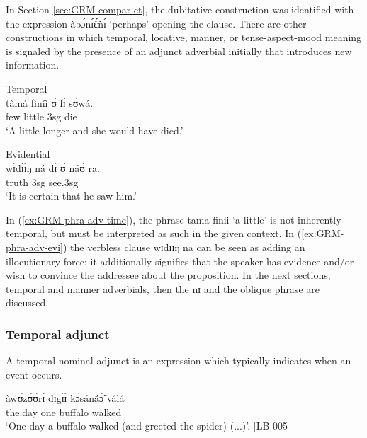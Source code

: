 \begin{exe}
\begin{exe}
\begin{exe}
 In Section \ref{sec:GRM-compar-ct}, the dubitative construction was 
identified with the expression {\sls àbɔ́nɪ̃́ɛ̃́nɪ́}  `perhaps'  opening the 
clause. There are other constructions in which temporal, locative, manner, or 
tense-aspect-mood meaning is signaled by the presence of an adjunct adverbial  
initially that introduces new information.  

\ea\label{ex:GRM-phra-adv}

\ea\label{ex:GRM-phra-adv-time}{\rm Temporal}\\
\gll {\ob}tàmá fìníì{\cb} ʊ̀ fɪ̀ sʊ́wá.\\
few little {\sc 3sg} {\mod} die\\
\glt `A little longer and she would  have died.'


\ex\label{ex:GRM-phra-adv-evi}{\rm Evidential}\\
\gll {\ob}wɪ́dɪ́ɪ́ŋ ná{\cb} dɪ́ ʊ̀ náʊ́ rā.\\
truth {\foc} {\comp} {\sc 3sg} see.{\sc 3sg} {\foc}\\
\glt  `It is certain that he saw him.'

\z 
 \z



In (\ref{ex:GRM-phra-adv-time}), the phrase {\sls tama finii} `a little'  is not inherently 
temporal, but must be interpreted as such in the given context. In 
(\ref{ex:GRM-phra-adv-evi}) the verbless clause {\sls wɪdɪɪŋ na}  can be seen as 
adding an illocutionary force; it additionally signifies that the speaker has 
evidence and/or wish to convince the addressee about the proposition. In the  
next sections,  temporal and manner adverbials, then the  {\sls nɪ} 
and the oblique phrase are discussed.


% 

\subsubsection{Temporal  adjunct}
\label{sec:GRM-temporal-adjunct}


A temporal nominal adjunct   is an expression which typically indicates when  an event occurs.

\ea\label{ex:GRM-adj-temp-adv}

\ea\label{ex:GRM-adj-temp-adv-LB5}
\gll {\ob}àwʊ̀zʊ́ʊ́rɪ̀  dɪ́gɪ́ɪ́{\cb}     kɔ̀sánã́ɔ̃́   válá \\
the.day one    buffalo walked \\
\glt `One day a buffalo walked (and greeted the spider) (...)'. [LB 005


\end{exe}
\end{exe}
\end{exe}

